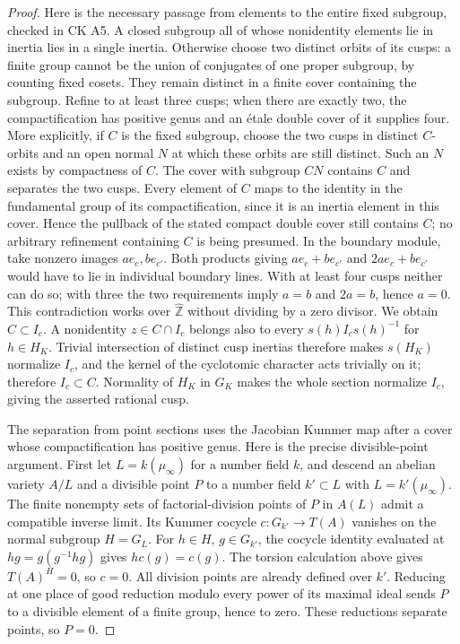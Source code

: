 \documentclass[11pt,oneside]{article}
\begin{document}
\begin{proof}
Here is the necessary passage from elements to the entire fixed
subgroup, checked in CK A5. A closed subgroup all of whose nonidentity
elements lie in inertia lies in a single inertia. Otherwise choose
two distinct orbits of its cusps: a finite group cannot be the union
of conjugates of one proper subgroup, by counting fixed cosets.
They remain distinct in a finite cover containing the subgroup.
Refine to at least three cusps; when there are exactly two, the
compactification has positive genus and an \'etale double cover of
it supplies four. More explicitly, if $C$ is the fixed subgroup,
choose the two cusps in distinct $C$-orbits and an open normal
$N$ at which these orbits are still distinct. Such an $N$ exists
by compactness of $C$. The cover with subgroup $CN$ contains $C$
and separates the two cusps. Every element of $C$ maps to the
identity in the fundamental group of its compactification,
since it is an inertia element in this cover. Hence the pullback
of the stated compact double cover still contains $C$; no
arbitrary refinement containing $C$ is being presumed.
In the boundary module, take nonzero images
$ae_c,be_{c'}$. Both products giving $ae_c+be_{c'}$ and
$2ae_c+be_{c'}$ would have to lie in individual boundary lines.
With at least four cusps neither can do so; with three the two
requirements imply $a=b$ and $2a=b$, hence $a=0$. This contradiction
works over $\widehat{\mathbb Z}$ without dividing by a zero divisor.
We obtain $C\subset I_c$. A nonidentity $z\in C\cap I_c$ belongs
also to every $s(h)I_cs(h)^{-1}$ for $h\in H_K$. Trivial intersection
of distinct cusp inertias therefore makes $s(H_K)$ normalize $I_c$,
and the kernel of the cyclotomic character acts trivially on it;
therefore $I_c\subset C$. Normality of $H_K$ in $G_K$ makes the whole
section normalize $I_c$, giving the asserted rational cusp.

The separation from point sections uses the Jacobian Kummer map
after a cover whose compactification has positive genus. Here is
the precise divisible-point argument. First let $L=k(\mu_\infty)$
for a number field $k$, and descend an abelian variety $A/L$ and
a divisible point $P$ to a number field $k'\subset L$ with
$L=k'(\mu_\infty)$. The finite nonempty sets of factorial-division
points of $P$ in $A(L)$ admit a compatible inverse limit. Its
Kummer cocycle $c:G_{k'}\to T(A)$ vanishes on the normal subgroup
$H=G_L$. For $h\in H$, $g\in G_{k'}$, the cocycle identity evaluated
at $hg=g(g^{-1}hg)$ gives $h c(g)=c(g)$. The torsion calculation
above gives $T(A)^H=0$, so $c=0$. All division points are already
defined over $k'$. Reducing at one place of good reduction modulo
every power of its maximal ideal sends $P$ to a divisible element
of a finite group, hence to zero. These reductions separate points,
so $P=0$.


\end{proof}
\end{document}
